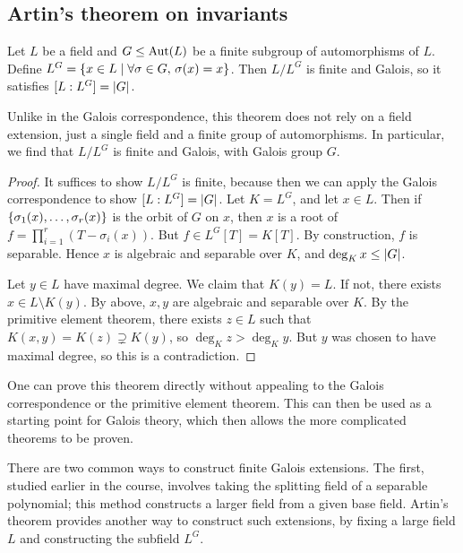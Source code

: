 \subsection{Artin's theorem on invariants}
\begin{theorem}[Artin]
	Let \( L \) be a field and \( G \leq \operatorname{Aut}(L) \) be a finite subgroup of automorphisms of \( L \).
	Define \( L^G = \qty{x \in L \mid \forall \sigma \in G,\, \sigma(x) = x} \).
	Then \( L / L^G \) is finite and Galois, so it satisfies \( [L:L^G] = \abs{G} \).
\end{theorem}
\begin{remark}
	Unlike in the Galois correspondence, this theorem does not rely on a field extension, just a single field and a finite group of automorphisms.
	In particular, we find that \( L / L^G \) is finite and Galois, with Galois group \( G \).
\end{remark}
\begin{proof}
	It suffices to show \( L/L^G \) is finite, because then we can apply the Galois correspondence to show \( [L:L^G] = \abs{G} \).
	Let \( K = L^G \), and let \( x \in L \).
	Then if \( \qty{\sigma_1(x), \dots, \sigma_r(x)} \) is the orbit of \( G \) on \( x \), then \( x \) is a root of \( f = \prod_{i=1}^r (T - \sigma_i(x)) \).
	But \( f \in L^G[T] = K[T] \).
	By construction, \( f \) is separable.
	Hence \( x \) is algebraic and separable over \( K \), and \( \deg_K x \leq \abs{G} \).

	Let \( y \in L \) have maximal degree.
	We claim that \( K(y) = L \).
	If not, there exists \( x \in L \setminus K(y) \).
	By above, \( x, y \) are algebraic and separable over \( K \).
	By the primitive element theorem, there exists \( z \in L \) such that \( K(x,y) = K(z) \supsetneq K(y) \), so \( \deg_K z > \deg_K y \).
	But \( y \) was chosen to have maximal degree, so this is a contradiction.
\end{proof}
\begin{remark}
	One can prove this theorem directly without appealing to the Galois correspondence or the primitive element theorem.
	This can then be used as a starting point for Galois theory, which then allows the more complicated theorems to be proven.

	There are two common ways to construct finite Galois extensions.
	The first, studied earlier in the course, involves taking the splitting field of a separable polynomial; this method constructs a larger field from a given base field.
	Artin's theorem provides another way to construct such extensions, by fixing a large field \( L \) and constructing the subfield \( L^G \).
\end{remark}
